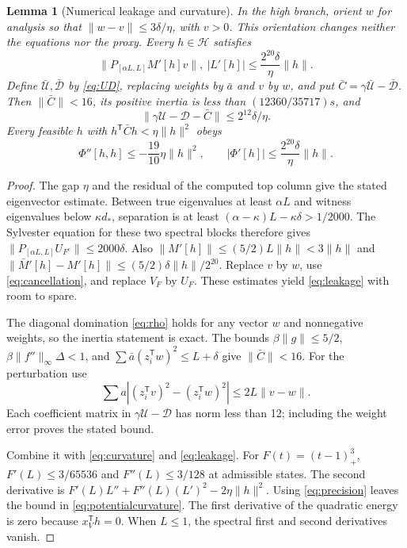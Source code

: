 \documentclass[11pt]{amsart}
\newtheorem{lemma}[theorem]{Lemma}
\theoremstyle{remark}\newtheorem{remark}[theorem]{Remark}
\newcommand{\T}{\mathsf T}
\newcommand{\calU}{\mathcal U}
\newcommand{\calD}{\mathcal D}
\begin{document}
\begin{lemma}[Numerical leakage and curvature]\label{lem:leakage}
In the high branch, orient $w$ for analysis so that
$\|w-v\|\le3\delta/\eta$, with $v>0$.
This orientation changes neither the equations nor the proxy.
Every $h\in\mathcal H$ satisfies
\begin{equation}\label{eq:leakage}
 \|P_{[\alpha L,L]}M'[h]v\|,\ |L'[h]|
 \le\frac{2^{20}\delta}{\eta}\|h\|.
\end{equation}
Define $\bar{\calU},\bar{\calD}$ by \eqref{eq:UD}, replacing weights by
$\bar a$ and $v$ by $w$, and put $\bar C=\gamma\bar{\calU}-\bar{\calD}$.
Then $\|\bar C\|<16$, its positive inertia is less than
$(12360/35717)s$, and
\[
 \|\gamma\calU-\calD-\bar C\|\le2^{12}\delta/\eta.
\]
Every feasible $h$ with $h^\T\bar C h<\eta\|h\|^2$ obeys
\begin{equation}\label{eq:potentialcurvature}
 \Phi''[h,h]\le-\frac{19}{10}\eta\|h\|^2,
 \qquad |\Phi'[h]|\le\frac{2^{20}\delta}{\eta}\|h\|.
\end{equation}
\end{lemma}
\begin{proof}
The gap $\eta$ and the residual of the computed top column give the stated
eigenvector estimate. Between true eigenvalues at least $\alpha L$ and
witness eigenvalues below $\kappa d_*$, separation is at least
$(\alpha-\kappa)L-\kappa\delta>1/2000$.
The Sylvester equation for these two spectral blocks therefore gives
$\|P_{[\alpha L,L]}U_{F^c}\|\le2000\delta$.
Also $\|M'[h]\|\le(5/2)L\|h\|<3\|h\|$ and
$\|\bar M'[h]-M'[h]\|\le(5/2)\delta\|h\|/2^{20}$.
Replace $v$ by $w$, use \eqref{eq:cancellation}, and replace $V_F$ by
$U_F$. These estimates yield \eqref{eq:leakage} with room to spare.

The diagonal domination \eqref{eq:rho} holds for any vector $w$ and
nonnegative weights, so the inertia statement is exact.
The bounds $\beta\|g\|\le5/2$,
$\beta\|f''\|_\infty\Delta<1$, and
$\sum\bar a(z_i^\T w)^2\le L+\delta$ give $\|\bar C\|<16$.
For the perturbation use
\[
 \sum a\left|(z_i^\T v)^2-(z_i^\T w)^2\right|
 \le2L\|v-w\|.
\]
Each coefficient matrix in $\gamma\calU-\calD$ has norm less than 12;
including the weight error proves the stated bound.

Combine it with \eqref{eq:curvature} and \eqref{eq:leakage}. For
$F(t)=(t-1)_+^3$, $F'(L)\le3/65536$ and $F''(L)\le3/128$ at admissible
states. The second derivative is
$F'(L)L''+F''(L)(L')^2-2\eta\|h\|^2$.
Using \eqref{eq:precision} leaves the bound in
\eqref{eq:potentialcurvature}. The first derivative of the quadratic
energy is zero because $x_V^\T h=0$. When $L\le1$, the spectral first and
second derivatives vanish.
\end{proof}
\end{document}
